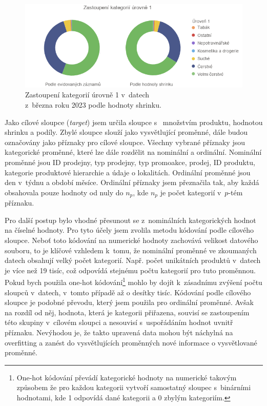 \begin{figure}[h!]
    \centering
    \captionsetup{justification=centering}
    \includegraphics[width=\textwidth]{obrazky/grafy/zastoupeniL1.png}
    \caption{Zastoupení kategorií úrovně 1 v~datech \\ z~března roku 2023 podle hodnoty shrinku.}
    \label{obr:rok:g:zastoupeni1}
\end{figure}



Jako cílové sloupce (\emph{target}) jsem určila sloupce s~ množstvím produktu, hodnotou shrinku a podíly. Zbylé sloupce slouží jako vysvětlující proměnné, dále budou označovány jako příznaky pro cílové sloupce. Všechny vybrané příznaky jsou kategorické proměnné, které lze dále rozdělit na nominální a ordinální. Nominální proměnné jsou ID prodejny, typ prodejny, typ promoakce, prodej, ID produktu, kategorie produktové hierarchie a údaje o lokalitách. Ordinální proměnné jsou den v~týdnu a období měsíce. Ordinální příznaky jsem přeznačila tak, aby každá obsahovala pouze hodnoty od nuly do $n_p$, kde $n_p$ je počet kategorií v~$p$-tém příznaku. 

Pro další postup bylo vhodné přesunout se z~nominálních kategorických hodnot na číselné hodnoty. Pro tyto účely jsem zvolila metodu kódování podle cílového sloupce.  %
Neboť toto kódování na numerické hodnoty zachovává velikost datového souboru, to je klíčové vzhledem k~tomu, že nominální proměnné ve zkoumaných datech obsahují velký počet kategorií. 
Např. počet unikátních produktů v~datech je více než 19 tisíc, což odpovídá stejnému počtu kategorií pro tuto proměnnou. Pokud bych použila one-hot kódování\footnote{One-hot kódování převádí kategorické hodnoty na numerické takovým způsobem že pro každou kategorii vytvoří samostatný sloupec s~binárními hodnotami, kde 1 odpovídá dané kategorii a 0 zbylým kategoriím.}  mohlo by dojít k~zásadnímu zvýšení počtu sloupců v~datech, v~tomto případě až o desítky tisíc. Kódování podle cílového sloupce je podobné převodu, který jsem použila pro ordinální proměnné. Avšak na rozdíl od něj, hodnota, která je kategorii přiřazena, souvisí se zastoupením této skupiny v~cílovém sloupci a nesouvisí s~uspořádáním hodnot uvnitř příznaku. Nevýhodou je, že takto upravená data mohou být náchylná na overfitting a zanést do vysvětlujících proměnných nové informace o vysvětlované proměnné. 

